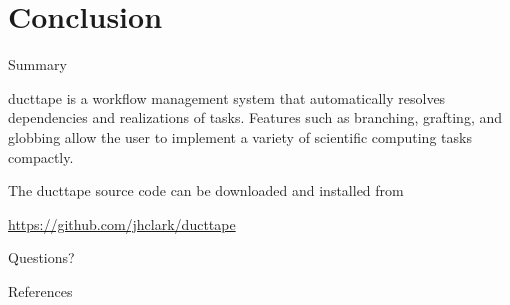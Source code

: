 \documentclass[10pt]{beamer}
\begin{document}
\section{Conclusion}

\begin{frame}{Summary}

  ducttape is a workflow management system that automatically resolves dependencies and realizations of tasks. Features such as branching, grafting, and globbing allow the user to implement a variety of scientific computing tasks compactly.
  
  The ducttape source code can be downloaded and installed from

  \begin{center}\url{https://github.com/jhclark/ducttape}\end{center}

\end{frame}

\begin{frame}[standout]
  Questions?
\end{frame}

\begin{frame}[allowframebreaks]{References}

  
  

\end{frame}
\end{document}
